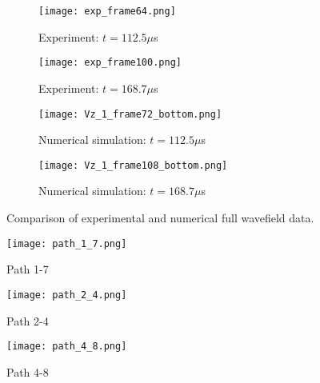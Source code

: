 \documentclass[preprint,12pt]{elsarticle}
\begin{document}
	\begin{figure} [h!]
		\begin{subfigure}[b]{0.49\textwidth}
			\centering
			\texttt{[image: exp\_frame64.png]}
			\caption{Experiment: $t=112.5  \mu$s}
			\label{fig:exp_frame64}
		\end{subfigure}
		\begin{subfigure}[b]{0.49\textwidth}
			\centering
			\texttt{[image: exp\_frame100.png]}
			\caption{Experiment: $t=168.7 \mu$s}
			\label{fig:exp_frame100.png}
		\end{subfigure}
		\hfill
		\begin{subfigure}[b]{0.49\textwidth}
			\centering
			\texttt{[image: Vz\_1\_frame72\_bottom.png]} 
			\caption{Numerical simulation: $t=112.5  \mu$s}
			\label{fig:num_frame72}
		\end{subfigure}
	\centering
	\begin{subfigure}[b]{0.49\textwidth}
		\centering
		\texttt{[image: Vz\_1\_frame108\_bottom.png]}
		\caption{Numerical simulation: $t=168.7 \mu$s}
		\label{fig:num_frame108}
	\end{subfigure}
	\hfill
		\caption{Comparison of experimental and numerical full wavefield data.} 
		\label{fig:wavefields_comparison}
	\end{figure}
	\begin{comment}
	\begin{figure} [h!]
		\begin{subfigure}[b]{0.49\textwidth}
			\centering
			\texttt{[image: cut\_Vz\_1\_frame72\_top.png]} 
			\caption{Numerical simulation: $t=112.5  \mu$s}
			\label{fig:num_frame72top}
		\end{subfigure}
		\centering
		\begin{subfigure}[b]{0.49\textwidth}
			\centering
			\texttt{[image: cut\_Vz\_1\_frame108\_top.png]}
			\caption{Numerical simulation: $t=168.7 \mu$s}
			\label{fig:num_frame108top}
		\end{subfigure}
		\hfill
		\caption{Numerical full wavefield data at top surface of the plate.} 
		\label{fig:num_wavefield_top}
	\end{figure}
\end{comment}
	\begin{figure} [h!]
			\centering
			\texttt{[image: path\_1\_7.png]}	
			\caption{Path 1-7}
			\label{fig:path1_7}
	\end{figure}
	\begin{figure} [h!]
		\centering
		\texttt{[image: path\_2\_4.png]}	
		\caption{Path 2-4}
		\label{fig:path2_4}
	\end{figure}
	\begin{figure} [h!]
		\centering
		\texttt{[image: path\_4\_8.png]}	
		\caption{Path 4-8}
		\label{fig:path4_8}
	\end{figure}
\clearpage
\end{document}
